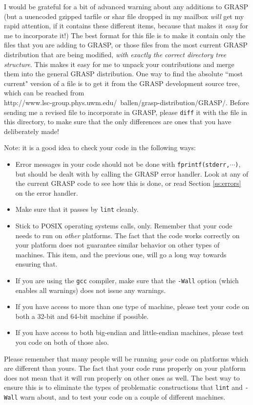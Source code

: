 I would be grateful for a bit of advanced warning about any additions to
GRASP (but a uuencoded gzipped tarfile or shar file dropped in my mailbox
{\it will} get my rapid attention, if it contains these different items,
because that makes it {\it easy} for me to incorporate it!)  The best
format for this file is to make it contain only the files that you are
adding to GRASP, or those files from the most current GRASP distribution
that are being modified, {\it with exactly the correct directory tree
structure}.  This makes it easy for me to unpack your contributions and
merge them into the general GRASP distribution.
One way to find the absolute ``most current" version of a file is
to get it from the GRASP development source tree, which can be reached from\\
{http://www.lsc-group.phys.uwm.edu/~ballen/grasp-distribution/GRASP/}.  Before sending me
a revised file to incorporate in GRASP, please {\tt diff} it with the file in this
directory, to make sure that the only differences are ones that you have deliberately made!

Note: it is a good idea to check your code in the following ways:
\begin{itemize}
\item Error messages in your code should not be done with
{\tt fprintf(stderr,$\cdots$)}, but should be dealt with
by calling the GRASP error handler.  Look at any of the current
GRASP code to see how this is done, or read Section \ref{ss:errors}
on the error handler.
\item Make sure that it passes by {\tt lint} cleanly.
\item Stick to POSIX operating systems calls, only.  Remember that
your code needs to run on {\it other} platforms.  The fact that the
code works correctly on your platform does not guarantee similar
behavior on other types of machines.  This item, and the previous one,
will go a long way towards ensuring that.
\item If you are using the {\tt gcc} compiler, make sure that
the {\tt -Wall} option (which enables all warnings) does not issue any
warnings.
\item If you have access to more than one type of machine, please test
your code on both a 32-bit and 64-bit machine if possible.
\item If you have access to both big-endian and little-endian
machines, please test you code on both of those also.
\end{itemize}
Please remember that many people will be running {\it your} code on
platforms which are different than yours.  The fact that your code
runs properly on your platform does not mean that it will run properly
on other ones as well.  The best way to ensure this is to eliminate
the types of problematic constructions that {\tt lint} and {\tt -Wall}
warn about, and to test your code on a couple of different machines.

